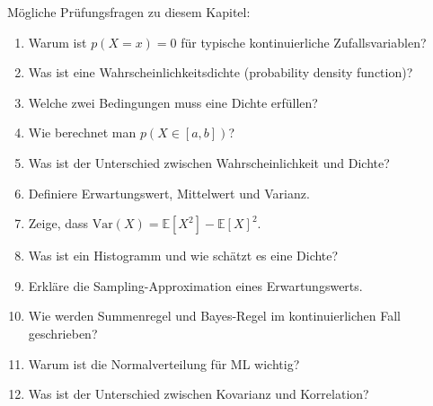 \begin{examtipbox}
Mögliche Prüfungsfragen zu diesem Kapitel:

\begin{enumerate}
    \item Warum ist \(p(X=x)=0\) für typische kontinuierliche Zufallsvariablen?
    \item Was ist eine Wahrscheinlichkeitsdichte (probability density function)?
    \item Welche zwei Bedingungen muss eine Dichte erfüllen?
    \item Wie berechnet man \(p(X \in [a,b])\)?
    \item Was ist der Unterschied zwischen Wahrscheinlichkeit und Dichte?
    \item Definiere Erwartungswert, Mittelwert und Varianz.
    \item Zeige, dass \(\mathrm{Var}(X)=\mathbb{E}[X^2]-\mathbb{E}[X]^2\).
    \item Was ist ein Histogramm und wie schätzt es eine Dichte?
    \item Erkläre die Sampling-Approximation eines Erwartungswerts.
    \item Wie werden Summenregel und Bayes-Regel im kontinuierlichen Fall geschrieben?
    \item Warum ist die Normalverteilung für ML wichtig?
    \item Was ist der Unterschied zwischen Kovarianz und Korrelation?
\end{enumerate}
\end{examtipbox}